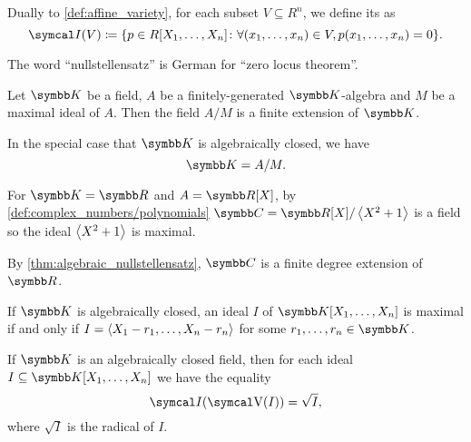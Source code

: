 \begin{definition}\label{def:ideal_of_affine_variety}\cite[70]{Коцев2016}
  Dually to \cref{def:affine_variety}, for each subset \( V \subseteq R^n \), we define its  as
  \begin{equation*}
    \Cal{I}(V) \coloneqq \{ p \in R[X_1, \ldots, X_n] \colon \forall (x_1, \ldots, x_n) \in V, p(x_1, \ldots, x_n) = 0 \}.
  \end{equation*}
\end{definition}

\begin{remark}\label{remark:nullstelletsatz_etymology}
  The word \enquote{nullstellensatz} is German for \enquote{zero locus theorem}.
\end{remark}

\begin{theorem}\label{thm:algebraic_nullstellensatz}\cite[64]{Коцев2016}
  Let \( \K \) be a field, \( A \) be a finitely-generated \( \K \)-algebra and \( M \) be a maximal ideal of \( A \). Then the field \( A / M \) is a finite extension of \( \K \).

  In the special case that \( \K \) is algebraically closed, we have
  \begin{equation*}
    \K = A / M.
  \end{equation*}
\end{theorem}

\begin{example}\label{ex:algebraic_nullstellensatz_real_over_complex}
  For \( \K = \R \) and \( A = \R[X] \), by \cref{def:complex_numbers/polynomials} \( \C = \R[X] / \Gen{X^2 + 1} \) is a field so the ideal \( \left\langle X^2 + 1 \right\rangle \) is maximal.

  By \cref{thm:algebraic_nullstellensatz}, \( \C \) is a finite degree extension of \( \R \).
\end{example}

\begin{corollary}\label{thm:closed_field_maximal_ideal_representation}\cite[exercise 8.1]{Коцев2016}
  If \( \K \) is algebraically closed, an ideal \( I \) of \( \K[X_1, \ldots, X_n] \) is maximal if and only if \( I = \left\langle X_1 - r_1, \ldots, X_n - r_n \right\rangle \) for some \( r_1, \ldots, r_n \in \K \).
\end{corollary}

\begin{theorem}\label{thm:geometric_nullstellensatz}\cite[70]{Коцев2016}
  If \( \K \) is an algebraically closed field, then for each ideal \( I \subseteq \K[X_1, \ldots, X_n] \) we have the equality
  \begin{equation*}
    \Cal{I}(\V(I)) = \sqrt I,
  \end{equation*}
  where \( \sqrt I \) is the radical of \( I \).
\end{theorem}

